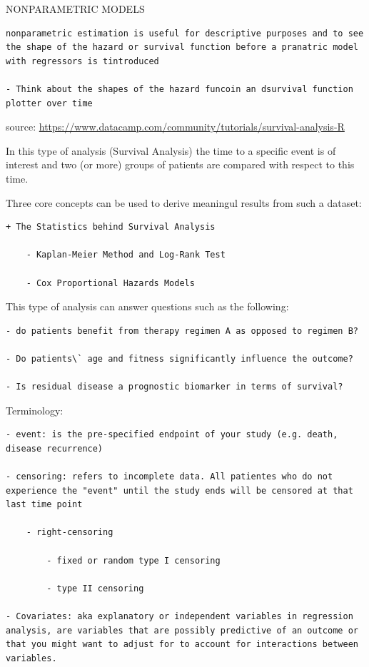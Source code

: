 \documentclass[
]{book}
\begin{document}
NONPARAMETRIC MODELS

\begin{verbatim}
nonparametric estimation is useful for descriptive purposes and to see the shape of the hazard or survival function before a pranatric model with regressors is tintroduced

- Think about the shapes of the hazard funcoin an dsurvival function plotter over time
\end{verbatim}

source: \url{https://www.datacamp.com/community/tutorials/survival-analysis-R}

In this type of analysis (Survival Analysis) the time to a specific event is of interest and two (or more) groups of patients are compared with respect to this time.

Three core concepts can be used to derive meaningul results from such a dataset:

\begin{verbatim}
+ The Statistics behind Survival Analysis

    - Kaplan-Meier Method and Log-Rank Test

    - Cox Proportional Hazards Models
\end{verbatim}

This type of analysis can answer questions such as the following:

\begin{verbatim}
- do patients benefit from therapy regimen A as opposed to regimen B?

- Do patients\` age and fitness significantly influence the outcome?

- Is residual disease a prognostic biomarker in terms of survival?
\end{verbatim}

Terminology:

\begin{verbatim}
- event: is the pre-specified endpoint of your study (e.g. death, disease recurrence)

- censoring: refers to incomplete data. All patientes who do not experience the "event" until the study ends will be censored at that last time point

    - right-censoring

        - fixed or random type I censoring

        - type II censoring

- Covariates: aka explanatory or independent variables in regression analysis, are variables that are possibly predictive of an outcome or that you might want to adjust for to account for interactions between variables.
\end{verbatim}
\end{document}
